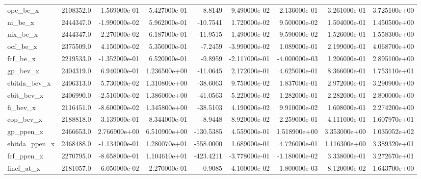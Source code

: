 \documentclass[10pt]{article}
\begin{document}
\begin{landscape}
\begin{longtable}{|l|r|r|r|r|r|r|r|r|}
ope\_be\_x                &  2108352.0 &  1.569000e-01 &  5.427000e-01 &     -8.8149 &  9.490000e-02 &  2.136000e-01 &  3.261000e-01 &  3.725100e+00 \\
ni\_be\_x                 &  2444347.0 & -1.990000e-02 &  5.962000e-01 &    -10.7541 &  1.720000e-02 &  9.500000e-02 &  1.504000e-01 &  1.450500e+00 \\
nix\_be\_x                &  2444347.0 & -2.270000e-02 &  6.187000e-01 &    -11.9515 &  1.490000e-02 &  9.590000e-02 &  1.526000e-01 &  1.558300e+00 \\
ocf\_be\_x                &  2375509.0 &  4.150000e-02 &  5.350000e-01 &     -7.2459 & -3.990000e-02 &  1.089000e-01 &  2.199000e-01 &  4.068700e+00 \\
fcf\_be\_x                &  2219533.0 & -1.352000e-01 &  6.520000e-01 &     -9.8959 & -2.117000e-01 & -4.000000e-03 &  1.206000e-01 &  2.895100e+00 \\
gp\_bev\_x                &  2404319.0 &  6.940000e-01 &  1.236500e+00 &    -11.0645 &  2.172000e-01 &  4.625000e-01 &  8.366000e-01 &  1.753110e+01 \\
ebitda\_bev\_x            &  2406313.0 &  5.730000e-02 &  1.310800e+00 &    -38.6063 &  9.750000e-02 &  1.837000e-01 &  2.972000e-01 &  3.290900e+00 \\
ebit\_bev\_x              &  2406990.0 & -2.510000e-02 &  1.386000e+00 &    -41.0563 &  5.220000e-02 &  1.282000e-01 &  2.282000e-01 &  2.800000e+00 \\
fi\_bev\_x                &  2116451.0 & -8.600000e-02 &  1.345800e+00 &    -38.5103 &  4.190000e-02 &  9.910000e-02 &  1.608000e-01 &  2.274200e+00 \\
cop\_bev\_x               &  2188818.0 &  3.139000e-01 &  8.344000e-01 &     -8.9448 &  8.920000e-02 &  2.259000e-01 &  4.111000e-01 &  1.607970e+01 \\
gp\_ppen\_x               &  2466653.0 &  2.766900e+00 &  6.510900e+00 &   -130.5385 &  4.559000e-01 &  1.518900e+00 &  3.353000e+00 &  1.035052e+02 \\
ebitda\_ppen\_x           &  2468488.0 & -1.134000e-01 &  1.280070e+01 &   -558.0000 &  1.689000e-01 &  4.726000e-01 &  1.116300e+00 &  3.389320e+01 \\
fcf\_ppen\_x              &  2270795.0 & -8.658000e-01 &  1.104610e+01 &   -423.4211 & -3.778000e-01 & -1.180000e-02 &  3.338000e-01 &  3.272670e+01 \\
fincf\_at\_x              &  2181057.0 &  6.050000e-02 &  2.270000e-01 &     -0.9085 & -4.100000e-02 &  1.800000e-03 &  8.120000e-02 &  1.643700e+00 \\

\end{longtable}
\end{landscape}
\end{document}
